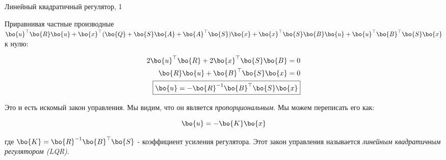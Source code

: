 \documentclass{beamer}
\begin{document}
\begin{frame}{Линейный квадратичный регулятор, 1}
	\begin{flushleft}
		
		
		Приравнивая частные производные $\bo{u}^\top \bo{R} \bo{u}
		+ 
		\bo{x}^\top (
		\bo{Q} + \bo{S} \bo{A} + \bo{A}^\top \bo{S}
		)\bo{x}
		+ 
		\bo{x}^\top \bo{S} \bo{B} \bo{u} 
		+ \bo{u}^\top \bo{B}^\top \bo{S} \bo{x}$ к нулю:
		
		
		\begin{align}
			2 \bo{u} ^\top \bo{R} + 
			2 \bo{x}^\top \bo{S} \bo{B} = 0
			\\
			\bo{R} \bo{u} + 
			\bo{B}^\top   \bo{S} \bo{x}= 0
			\\
			\boxed{
				\bo{u} = 
				-\bo{R}^{-1} \bo{B}^\top \bo{S} \bo{x}}
		\end{align}
		
		Это и есть искомый закон управления. Мы видим, что он является \emph{пропорциональным}. Мы можем переписать его как:
		
		\begin{equation}
			\bo{u} = -\bo{K} \bo{x}
		\end{equation}
		
		где $\bo{K}  = \bo{R}^{-1} \bo{B}^\top \bo{S}$ - коэффициент усиления регулятора. Этот закон управления называется \emph{линейным квадратичным регулятором (LQR)}.
		
	\end{flushleft}
\end{frame}
\end{document}
